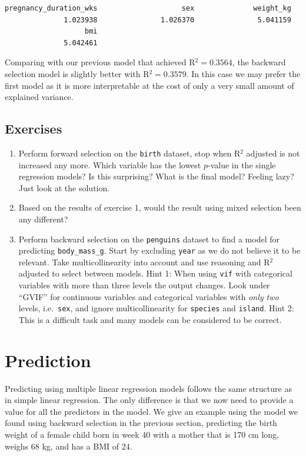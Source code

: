 \documentclass[
  letterpaper,
  DIV=11,
  numbers=noendperiod]{scrreprt}
\providecommand{\tightlist}{%
  \setlength{\itemsep}{0pt}\setlength{\parskip}{0pt}}\usepackage{longtable,booktabs,array}
\begin{document}
\begin{verbatim}
pregnancy_duration_wks                    sex              weight_kg 
              1.023938               1.026370               5.041159 
                   bmi 
              5.042461 
\end{verbatim}

Comparing with our previous model that achieved R\(^2 = 0.3564\), the
backward selection model is slightly better with R\(^2 = 0.3579\). In
this case we may prefer the first model as it is more interpretable at
the cost of only a very small amount of explained variance.

\subsection{Exercises}\label{exercises-20}

\begin{enumerate}
\def\labelenumi{\arabic{enumi}.}
\tightlist
\item
  Perform forward selection on the \texttt{birth} dataset, stop when
  R\(^2\) adjusted is not increased any more. Which variable has the
  lowest \(p\)-value in the single regression models? Is this
  surprising? What is the final model? Feeling lazy? Just look at the
  solution.
\item
  Based on the results of exercise 1, would the result using mixed
  selection been any different?
\item
  Perform backward selection on the \texttt{penguins} dataset to find a
  model for predicting \texttt{body\_mass\_g}. Start by excluding
  \texttt{year} as we do not believe it to be relevant. Take
  multicollinearity into account and use reasoning and R\(^2\) adjusted
  to select between models. Hint 1: When using \texttt{vif} with
  categorical variables with more than three levels the output changes.
  Look under ``GVIF'' for continuous variables and categorical variables
  with \emph{only two} levels, i.e.~\texttt{sex}, and ignore
  multicollinearity for \texttt{species} and \texttt{island}. Hint 2:
  This is a difficult task and many models can be considered to be
  correct.
\end{enumerate}

\section{Prediction}\label{prediction}

Predicting using multiple linear regression models follows the same
structure as in simple linear regression. The only difference is that we
now need to provide a value for all the predictors in the model. We give
an example using the model we found using backward selection in the
previous section, predicting the birth weight of a female child born in
week 40 with a mother that is 170 cm long, weighs 68 kg, and has a BMI
of 24.
\end{document}
